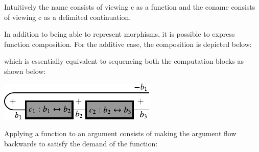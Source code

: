 \documentclass[preprint]{sigplanconf}
\begin{document}
Intuitively the name consists of viewing {{c}} as a function and the coname
consists of viewing {{c}} as a delimited continuation.

In addition to being able to represent morphisms, it is possible to express
function composition. For the additive case, the composition is depicted
below:

\begin{multicols}{2}

\end{multicols}
which is essentially equivalent to sequencing both the computation blocks as
shown below:

\begin{center}
  \includegraphics{diagrams/compose2.pdf}
\end{center}

Applying a function to an argument consists of making the argument flow
backwards to satisfy the demand of the function:
\begin{multicols}{2}
\begin{center}
\end{center}
\begin{center}
\end{center}
\end{multicols}
\end{document}
